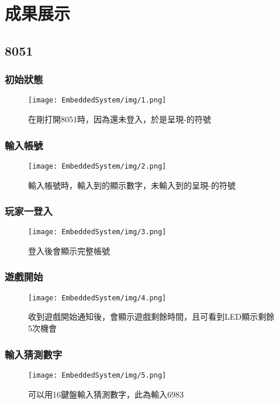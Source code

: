 \documentclass{scrartcl}
\begin{document}
\section{成果展示}

\subsection{8051}

\subsubsection{初始狀態}
\begin{figure}[h]
  \centering
  \texttt{[image: EmbeddedSystem/img/1.png]}
  \caption{在剛打開8051時，因為還未登入，於是呈現-的符號}
  \label{fig1}
\end{figure}

\FloatBarrier
\newpage
\subsubsection{輸入帳號}
\begin{figure}[h]
  \centering
  \texttt{[image: EmbeddedSystem/img/2.png]}
  \caption{輸入帳號時，輸入到的顯示數字，未輸入到的呈現-的符號}
  \label{fig2}
\end{figure}


\FloatBarrier
\newpage
\subsubsection{玩家一登入}
\begin{figure}[h]
  \centering
  \texttt{[image: EmbeddedSystem/img/3.png]}
  \caption{登入後會顯示完整帳號}
  \label{fig3}
\end{figure}


\FloatBarrier
\newpage
\subsubsection{遊戲開始}
\begin{figure}[h]
  \centering
  \texttt{[image: EmbeddedSystem/img/4.png]}
  \caption{收到遊戲開始通知後，會顯示遊戲剩餘時間，且可看到LED顯示剩餘5次機會}
  \label{fig4}
\end{figure}


\FloatBarrier
\newpage
\subsubsection{輸入猜測數字}
\begin{figure}[h]
  \centering
  \texttt{[image: EmbeddedSystem/img/5.png]}
  \caption{可以用16鍵盤輸入猜測數字，此為輸入6983}
  \label{fig5}
\end{figure}
\end{document}
